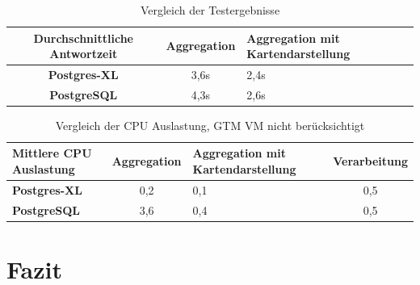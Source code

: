 \documentclass{beamer}
\begin{document}
\begin{frame}\frametitle{}
\begin{table}
\centering
\small
\begin{tabular}{|c|c|C{3cm}|}
\hline
\textbf{Durchschnittliche Antwortzeit} & \textbf{Aggregation} & \textbf{Aggregation mit Kartendarstellung} \\ \hline
\textbf{Postgres-XL} & 3,6s & 2,4s \\ \hline
\textbf{PostgreSQL} & 4,3s & 2,6s \\ \hline
\end{tabular}
\caption{Vergleich der Testergebnisse}
\end{table}

\begin{table}
\centering
\small
\begin{tabular}{|C{2.4cm}|c|C{2.9cm}|c|}
\hline
\textbf{Mittlere CPU Auslastung} & \textbf{Aggregation} & \textbf{Aggregation mit Kartendarstellung} & \textbf{Verarbeitung} \\ \hline
\textbf{Postgres-XL} & 0,2 & 0,1 & 0,5 \\ \hline
\textbf{PostgreSQL} & 3,6 & 0,4 & 0,5 \\ \hline	
\end{tabular}
\caption{Vergleich der CPU Auslastung, GTM VM nicht berücksichtigt}
\end{table}
\end{frame}

\section{Fazit}
 
\begin{frame}\frametitle{}

\end{frame}
\end{document}
